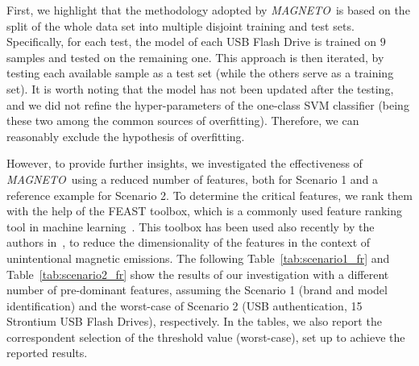 \documentclass[acmsmall, authorversion]{acmart}
\newcommand{\sol}{\emph{MAGNETO}}
\begin{document}
First, we highlight that the methodology adopted by \sol\ is based on the split of the whole data set into multiple disjoint training and test sets. Specifically, for each test, the model of each USB Flash Drive is trained on $9$ samples and tested on the remaining one. This approach is then iterated, by testing each available sample as a test set (while the others serve as a training set). It is worth noting that the model has not been updated after the testing, and we did not refine the hyper-parameters of the one-class SVM classifier (being these two among the common sources of overfitting). Therefore, we can reasonably exclude the hypothesis of overfitting.

However, to provide further insights, we investigated the effectiveness of \sol\ using a reduced number of features, both for Scenario 1 and a reference example for Scenario 2. To determine the critical features, we rank them with the help of the FEAST toolbox, which is a commonly used feature ranking tool in machine learning~\cite{brown2012_jmlr}.  This toolbox has been used also recently by the authors in~\cite{Cheng2019_ccs}, to reduce the dimensionality of the features in the context of unintentional magnetic emissions.
The following Table~\ref{tab:scenario1_fr} and Table~\ref{tab:scenario2_fr} show the results of our investigation with a different number of pre-dominant features, assuming the Scenario 1 (brand and model identification) and the worst-case of Scenario 2 (USB authentication, 15 Strontium USB Flash Drives), respectively. In the tables, we also report the correspondent selection of the threshold value (worst-case), set up to achieve the reported results.
\end{document}
